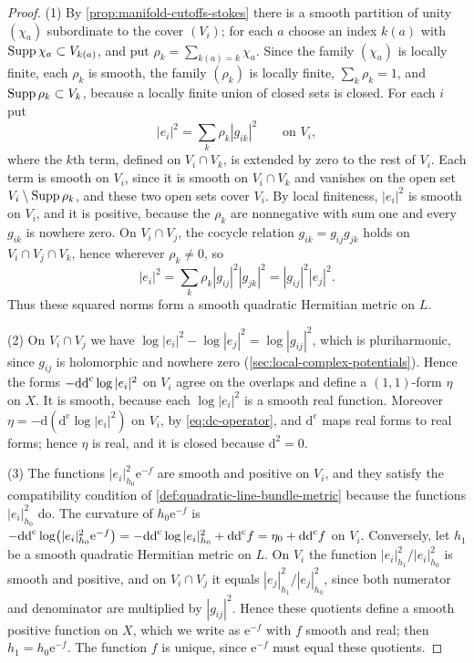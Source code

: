 \begin{proof}
(1) By \cref{prop:manifold-cutoffs-stokes} there is a smooth partition of unity $(\chi_a)$ subordinate to the cover $(V_i)$; for each $a$ choose an index $k(a)$ with $\operatorname{Supp}\chi_a\subset V_{k(a)}$, and put $\rho_k=\sum_{k(a)=k}\chi_a$. Since the family $(\chi_a)$ is locally finite, each $\rho_k$ is smooth, the family $(\rho_k)$ is locally finite, $\sum_k\rho_k=1$, and $\operatorname{Supp}\rho_k\subset V_k$, because a locally finite union of closed sets is closed. For each $i$ put
\[
 |e_i|^2=\sum_k\rho_k|g_{ik}|^2\qquad\text{on }V_i,
\]
where the $k$th term, defined on $V_i\cap V_k$, is extended by zero to the rest of $V_i$. Each term is smooth on $V_i$, since it is smooth on $V_i\cap V_k$ and vanishes on the open set $V_i\setminus\operatorname{Supp}\rho_k$, and these two open sets cover $V_i$. By local finiteness, $|e_i|^2$ is smooth on $V_i$, and it is positive, because the $\rho_k$ are nonnegative with sum one and every $g_{ik}$ is nowhere zero. On $V_i\cap V_j$, the cocycle relation $g_{ik}=g_{ij}g_{jk}$ holds on $V_i\cap V_j\cap V_k$, hence wherever $\rho_k\neq0$, so
\[
 |e_i|^2=\sum_k\rho_k|g_{ij}|^2|g_{jk}|^2=|g_{ij}|^2|e_j|^2.
\]
Thus these squared norms form a smooth quadratic Hermitian metric on $L$.

(2) On $V_i\cap V_j$ we have $\log|e_i|^2-\log|e_j|^2=\log|g_{ij}|^2$, which is pluriharmonic, since $g_{ij}$ is holomorphic and nowhere zero (\cref{sec:local-complex-potentials}). Hence the forms $-\mathrm{dd}^{\mathrm{c}}\log|e_i|^2$ on $V_i$ agree on the overlaps and define a $(1,1)$-form $\eta$ on $X$. It is smooth, because each $\log|e_i|^2$ is a smooth real function. Moreover $\eta=-\mathrm d(\mathrm d^{\mathrm c}\log|e_i|^2)$ on $V_i$, by \eqref{eq:dc-operator}, and $\mathrm d^{\mathrm c}$ maps real forms to real forms; hence $\eta$ is real, and it is closed because $\mathrm d^2=0$.

(3) The functions $|e_i|_{h_0}^2\mathrm e^{-f}$ are smooth and positive on $V_i$, and they satisfy the compatibility condition of \cref{def:quadratic-line-bundle-metric} because the functions $|e_i|_{h_0}^2$ do. The curvature of $h_0\mathrm e^{-f}$ is $-\mathrm{dd}^{\mathrm{c}}\log\bigl(|e_i|_{h_0}^2\mathrm e^{-f}\bigr)=-\mathrm{dd}^{\mathrm{c}}\log|e_i|_{h_0}^2+\mathrm{dd}^{\mathrm{c}} f=\eta_0+\mathrm{dd}^{\mathrm{c}} f$ on $V_i$. Conversely, let $h_1$ be a smooth quadratic Hermitian metric on $L$. On $V_i$ the function $|e_i|_{h_1}^2/|e_i|_{h_0}^2$ is smooth and positive, and on $V_i\cap V_j$ it equals $|e_j|_{h_1}^2/|e_j|_{h_0}^2$, since both numerator and denominator are multiplied by $|g_{ij}|^2$. Hence these quotients define a smooth positive function on $X$, which we write as $\mathrm e^{-f}$ with $f$ smooth and real; then $h_1=h_0\mathrm e^{-f}$. The function $f$ is unique, since $\mathrm e^{-f}$ must equal these quotients.
\end{proof}

